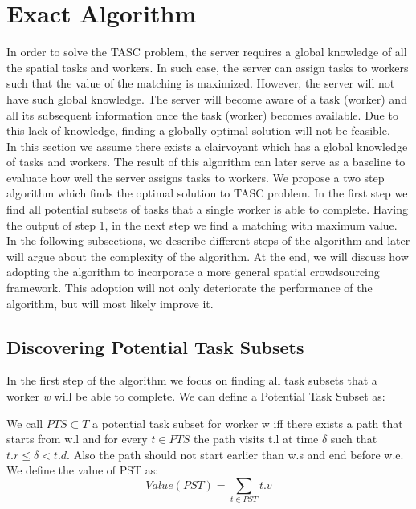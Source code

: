 \section{Exact Algorithm}

In order to solve the TASC problem, the server requires a global knowledge of all the spatial tasks and workers. In such case, the server can assign tasks to workers such that the value of the matching is maximized. However, the server will not have such global knowledge. The server will become aware of a task (worker) and all its subsequent information once the task (worker) becomes available. Due to this lack of knowledge, finding a globally optimal solution will not be feasible.\\

In this section we assume there exists a clairvoyant which has a global knowledge of tasks and workers. The result of this algorithm can later serve as a baseline to evaluate how well the server assigns tasks to workers. We propose a two step algorithm which finds the optimal solution to TASC problem. In the first step we find all potential subsets of tasks that a single worker is able to complete. Having the output of step 1, in the next step we find a matching with maximum value. In the following subsections, we describe different steps of the algorithm and later will argue about the complexity of the algorithm. At the end, we will discuss how adopting the algorithm to incorporate a more general spatial crowdsourcing framework. This adoption will not only deteriorate the performance of the algorithm, but will most likely improve it.

\subsection{Discovering Potential Task Subsets}
In the first step of the algorithm we focus on finding all task subsets that a worker \emph{w} will be able to complete. We can define a Potential Task Subset as:

\begin{definition} 
We call $PTS \subset T$ a potential task subset for worker w iff there exists a path that starts from w.l and for every $t \in PTS$ the path visits t.l at time $\delta$ such that $t.r \leq \delta < t.d$. Also the path should not start earlier than w.s and end before w.e. We define the value of PST as:
\begin{equation*}
Value(PST) = \sum_{t \in PST} t.v
\end{equation*}
\end{definition}

